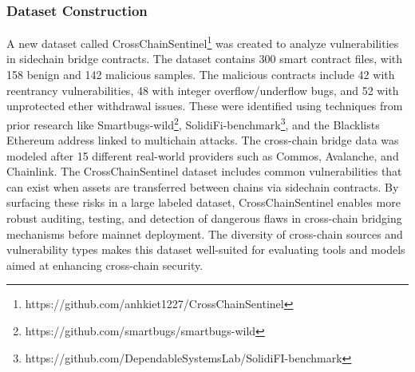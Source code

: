 \documentclass[sigconf]{acmart}
\begin{document}
\subsubsection{Dataset Construction}
A new dataset called CrossChainSentinel\footnote{https://github.com/anhkiet1227/CrossChainSentinel} was created to analyze vulnerabilities in sidechain bridge contracts. The dataset contains 300 smart contract files, with 158 benign and 142 malicious samples. The malicious contracts include 42 with reentrancy vulnerabilities, 48 with integer overflow/underflow bugs, and 52 with unprotected ether withdrawal issues. These were identified using techniques from prior research like Smartbugs-wild\footnote{https://github.com/smartbugs/smartbugs-wild}, SolidiFi-benchmark\footnote{https://github.com/DependableSystemsLab/SolidiFI-benchmark}, and the Blacklists Ethereum address linked to multichain attacks. The cross-chain bridge data was modeled after 15 different real-world providers such as Commos, Avalanche, and Chainlink. The CrossChainSentinel dataset includes common vulnerabilities that can exist when assets are transferred between chains via sidechain contracts. By surfacing these risks in a large labeled dataset, CrossChainSentinel enables more robust auditing, testing, and detection of dangerous flaws in cross-chain bridging mechanisms before mainnet deployment. The diversity of cross-chain sources and vulnerability types makes this dataset well-suited for evaluating tools and models aimed at enhancing cross-chain security.
\end{document}

